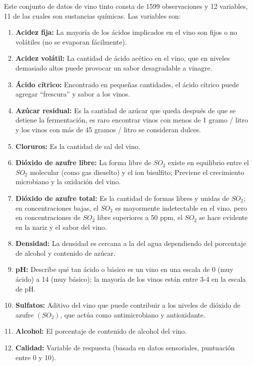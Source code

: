 \documentclass[
]{article}
\begin{document}
Este conjunto de datos de vino tinto consta de 1599 observaciones y 12
variables, 11 de las cuales son sustancias químicas. Las variables son:

\begin{enumerate}
\def\labelenumi{\arabic{enumi}.}
\item
  \textbf{Acidez fija:} La mayoría de los ácidos implicados en el vino
  son fijos o no volátiles (no se evaporan fácilmente).
\item
  \textbf{Acidez volátil:} La cantidad de ácido acético en el vino, que
  en niveles demasiado altos puede provocar un sabor desagradable a
  vinagre.
\item
  \textbf{Ácido cítrico:} Encontrado en pequeñas cantidades, el ácido
  cítrico puede agregar ``frescura'' y sabor a los vinos.
\item
  \textbf{Azúcar residual:} Es la cantidad de azúcar que queda después
  de que se detiene la fermentación, es raro encontrar vinos con menos
  de 1 gramo / litro y los vinos con más de 45 gramos / litro se
  consideran dulces.
\item
  \textbf{Cloruros:} Es la cantidad de sal del vino.
\item
  \textbf{Dióxido de azufre libre:} La forma libre de \(SO_{2}\) existe
  en equilibrio entre el \(SO_{2}\) molecular (como gas disuelto) y el
  ion bisulfito; Previene el crecimiento microbiano y la oxidación del
  vino.
\item
  \textbf{Dióxido de azufre total:} Es la cantidad de formas libres y
  unidas de \(SO_{2}\); en concentraciones bajas, el \(SO_{2}\) es
  mayormente indetectable en el vino, pero en concentraciones de
  \(SO_{2}\) libre superiores a 50 ppm, el \(SO_{2}\) se hace evidente
  en la nariz y el sabor del vino.
\item
  \textbf{Densidad:} La densidad es cercana a la del agua dependiendo
  del porcentaje de alcohol y contenido de azúcar.
\item
  \textbf{pH:} Describe qué tan ácido o básico es un vino en una escala
  de 0 (muy ácido) a 14 (muy básico); la mayoría de los vinos están
  entre 3-4 en la escala de pH.
\item
  \textbf{Sulfatos:} Aditivo del vino que puede contribuir a los niveles
  de dióxido de azufre \((SO_{2})\), que actúa como antimicrobiano y
  antioxidante.
\item
  \textbf{Alcohol:} El porcentaje de contenido de alcohol del vino.
\item
  \textbf{Calidad:} Variable de respuesta (basada en datos sensoriales,
  puntuación entre 0 y 10).
\end{enumerate}
\end{document}
